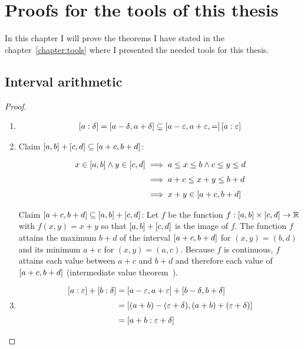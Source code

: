 \chapter{Proofs for the tools of this thesis}

In this chapter I will prove the theorems I have stated in the chapter~\ref{chapter:tools} where I presented the needed tools for this thesis.

\section{Interval arithmetic}



\begin{proof} ~
  \begin{enumerate}
    \item

      \begin{align}
        \an[\delta]{a} = \interval{a-\delta}{a+\delta} \subseteq \interval{a-\epsilon,a+\epsilon} = \an[\epsilon]{a}
      \end{align}

    \item Claim $\interval ab + \interval cd \subseteq \interval{a+c}{b+d}$:

      \begin{align}
        x \in \interval ab \land y \in \interval cd & \implies a \le x \le b \land c \le y \le d \nl
        & \implies a+c \le x+y \le b+d \nl
        & \implies x+y \in \interval{a+c}{b+d}
      \end{align}

      Claim $\interval{a+c}{b+d} \subseteq \interval ab + \interval cd$: Let $f$ be the function $f: \interval ab \times \interval cd \to \R$ with $f(x,y) =x+y$ so that $\interval ab + \interval cd$ is the image of $f$. The function $f$ attains the maximum $b+d$ of the interval $\interval{a+c}{b+d}$ for $(x,y) = (b,d)$ and its minimum $a+c$ for $(x,y)=(a,c)$. Because $f$ is continuous, $f$ attains each value between $a+c$ and $b+d$ and therefore each value of $\interval{a+c}{b+d}$ (intermediate value theorem~\cite{wiki:intermediatevaluetheorem}).

    \item

      \begin{align}
        \an[\epsilon]{a} + \an[\delta]{b} & = \interval{a-\epsilon}{a+\epsilon} + \interval{b-\delta}{b+\delta} \nl
        & = \interval{(a+b)-(\epsilon+\delta)}{(a+b)+(\epsilon+\delta)} \nl
        & = \an[\epsilon+\delta]{a+b}
      \end{align}


\end{enumerate}
\end{proof}
